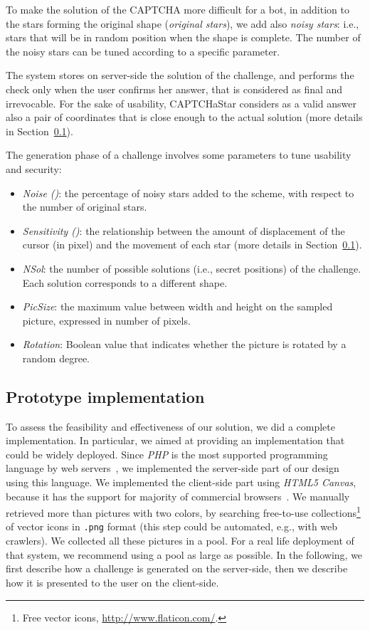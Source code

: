 \documentclass[conference]{IEEEtran}
\begin{document}
To make the solution of the CAPTCHA more difficult for a bot, in addition to the stars forming the original shape (\textit{original stars}), we add also \textit{noisy stars}: i.e., stars that will be in random position when the shape is complete.
The number of the noisy stars can be tuned according to a specific parameter. 

The system stores on server-side the solution of the challenge, and performs the  check only when the user confirms her answer, that is considered as final and irrevocable.
For the sake of usability,
CAPTCHaStar considers as a valid answer also a pair of coordinates that is close enough to the actual solution (more details in Section~\ref{prototypeimplementation}).

The generation phase of a challenge involves some parameters to tune usability and security: \label{generationparameters}
\begin{itemize} \item \textit{Noise ()}: the percentage of noisy stars added to the scheme, with respect to the number of original stars.
  \item \textit{Sensitivity ()}:
  the relationship between the amount of displacement of the cursor (in pixel) and the movement of each star  (more details in Section~\ref{prototypeimplementation}). 
\item \textit{NSol}: the number of possible solutions (i.e., secret positions) of the challenge.
  Each solution corresponds to a different shape.
  \item \textit{PicSize}: the maximum value between width and height on the sampled picture, expressed in number of pixels. \item \textit{Rotation}: Boolean value that indicates whether the picture is rotated by a random degree. \end{itemize}

\subsection{Prototype implementation}
\label{prototypeimplementation}
To assess the feasibility and effectiveness of our solution, we did a complete implementation.
In particular, we aimed at providing an implementation that could be widely deployed.
Since \textit{PHP} is the most supported programming language by web servers~\cite{commonserversidelanguage},
we implemented the server-side part of our design using this language.
We implemented the client-side part using \textit{HTML5 Canvas}, because it has the support for majority of commercial browsers~\cite{canvassupport}. 
We manually retrieved more than  pictures with two colors, by searching free-to-use collections\footnote{Free vector icons, \url{http://www.flaticon.com/}.} of vector icons in \texttt{.png} format (this step could be automated, e.g., with web crawlers).
We collected all these pictures in a pool. For a real life deployment of that system, we recommend using a pool as large as possible.
In the following, we first describe how a challenge is generated on the server-side, then we describe how it is presented to the user on the client-side.
\end{document}
